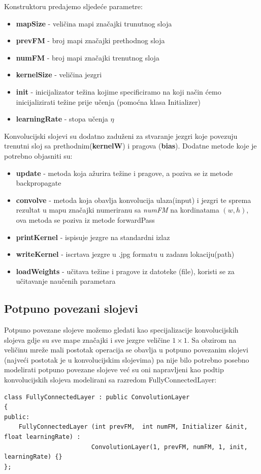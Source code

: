 \documentclass[times, utf8, zavrsni, numeric]{fer}
\begin{document}
Konstruktoru predajemo sljedeće parametre:
\begin{itemize}
\item \textbf{mapSize} - veličina mapi značajki trunutnog sloja
\item \textbf{prevFM} - broj mapi značajki prethodnog sloja
\item \textbf{numFM} - broj mapi značajki trenutnog sloja
\item \textbf{kernelSize} - veličina jezgri
\item \textbf{init} - inicijalizator težina kojime specificiramo na koji način ćemo inicijalizirati težine prije učenja (pomoćna klasa Initializer)
\item \textbf{learningRate} - stopa učenja $\eta$
\end{itemize}

Konvolucijski slojevi su dodatno zaduženi za stvaranje jezgri koje povezuju trenutni sloj sa prethodnim(\textbf{kernelW}) i pragova (\textbf{bias}). Dodatne metode koje je potrebno objasniti su:
\begin{itemize}
\item \textbf{update} - metoda koja ažurira težine i pragove, a poziva se iz metode backpropagate
\item \textbf{convolve} - metoda koja obavlja konvolucija ulaza(input) i jezgri te sprema rezultat u mapu značajki numeriranu sa \textit{numFM} na kordinatama $(w, h)$, ova metoda se poziva iz metode forwardPass
\item \textbf{printKernel} - ispisuje jezgre na standardni izlaz
\item \textbf{writeKernel} - iscrtava jezgre u .jpg formatu u zadanu lokaciju(path)
\item \textbf{loadWeights} - učitava težine i pragove iz datoteke (file), koristi se za učitavanje naučenih parametara
\end{itemize}

\subsection{Potpuno povezani slojevi}
Potpuno povezane slojeve možemo gledati kao specijalizacije konvolucijskih slojeva gdje su sve mape značajki i sve jezgre veličine $1 \times 1$. Sa obzirom na veličinu mreže mali postotak operacija se obavlja u potpuno povezanim slojevi (najveći postotak je u konvolucijskim slojevima) pa nije bilo potrebno posebno modelirati potpuno povezane slojeve već su oni napravljeni kao podtip konvolucijskih slojeva modelirani sa razredom FullyConnectedLayer:
\begin{lstlisting}[caption=Razred FullyConnectedLayer,
  label=FullLayer]
class FullyConnectedLayer : public ConvolutionLayer
{
public:
    FullyConnectedLayer (int prevFM,  int numFM, Initializer &init, float learningRate) :
                        ConvolutionLayer(1, prevFM, numFM, 1, init, learningRate) {}
};
\end{lstlisting}
\end{document}
